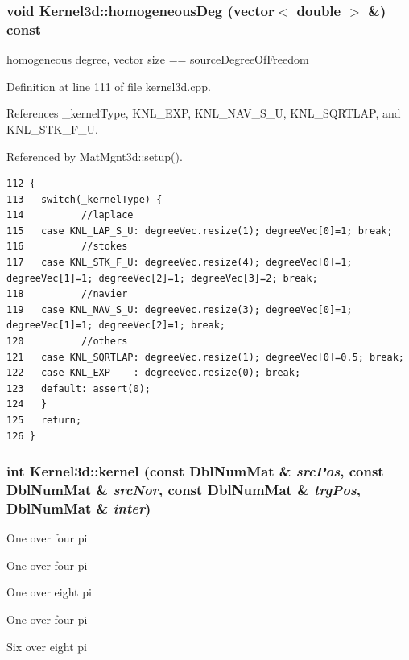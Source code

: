 \subsubsection{\setlength{\rightskip}{0pt plus 5cm}void Kernel3d::homogeneous\-Deg (vector$<$ double $>$ \&) const}\label{classKernel3d_e80fa2b1a2bc4b94c876c5c455b0ffb5_e80fa2b1a2bc4b94c876c5c455b0ffb5}


homogeneous degree, vector size == source\-Degree\-Of\-Freedom 



Definition at line 111 of file kernel3d.cpp.

References \_\-kernel\-Type, KNL\_\-EXP, KNL\_\-NAV\_\-S\_\-U, KNL\_\-SQRTLAP, and KNL\_\-STK\_\-F\_\-U.

Referenced by Mat\-Mgnt3d::setup().

\footnotesize\begin{verbatim}112 {
113   switch(_kernelType) {
114          //laplace
115   case KNL_LAP_S_U: degreeVec.resize(1); degreeVec[0]=1; break;
116          //stokes
117   case KNL_STK_F_U: degreeVec.resize(4); degreeVec[0]=1; degreeVec[1]=1; degreeVec[2]=1; degreeVec[3]=2; break;
118          //navier
119   case KNL_NAV_S_U: degreeVec.resize(3); degreeVec[0]=1; degreeVec[1]=1; degreeVec[2]=1; break;
120          //others
121   case KNL_SQRTLAP: degreeVec.resize(1); degreeVec[0]=0.5; break;
122   case KNL_EXP    : degreeVec.resize(0); break;
123   default: assert(0);
124   }
125   return;
126 }
\end{verbatim}\normalsize 


\subsubsection{\setlength{\rightskip}{0pt plus 5cm}int Kernel3d::kernel (const Dbl\-Num\-Mat \& {\em src\-Pos}, const Dbl\-Num\-Mat \& {\em src\-Nor}, const Dbl\-Num\-Mat \& {\em trg\-Pos}, Dbl\-Num\-Mat \& {\em inter})}\label{classKernel3d_4269ebb68ba66f9033c346368ef978aa_4269ebb68ba66f9033c346368ef978aa}


One over four pi

One over four pi

One over eight pi

One over four pi

Six over eight pi

